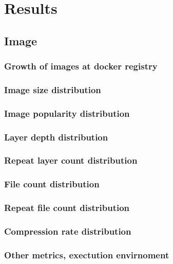 
\section{Results}

\subsection{Image}

\subsubsection{Growth  of images at docker registry}

\subsubsection{Image size distribution}

\subsubsection{Image popularity distribution}

\subsubsection{Layer depth distribution}

\subsubsection{Repeat layer count distribution}

\subsubsection{File count distribution}

\subsubsection{Repeat file count distribution}

\subsubsection{Compression rate distribution}

\subsubsection{Other metrics, exectution envirnoment}

